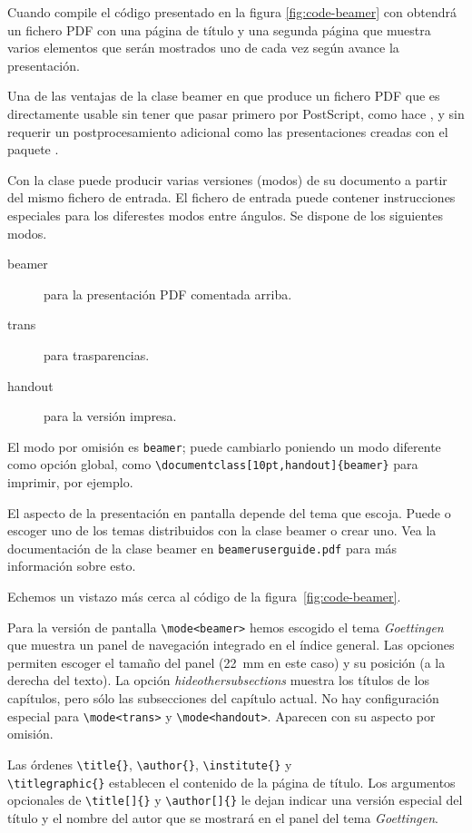 Cuando compile el código presentado en la figura \ref{fig:code-beamer}
con  obtendrá un fichero PDF con una página de título y
una segunda página que muestra varios elementos que serán mostrados
uno de cada vez según avance la presentación.

Una de las ventajas de la clase beamer en que produce un fichero PDF
que es directamente usable sin tener que pasar primero por
PostScript, como hace , y sin requerir un
postprocesamiento adicional como las presentaciones creadas con el
paquete .

Con la clase  puede producir varias versiones (modos) de
su documento a partir del mismo fichero de entrada.  El fichero de
entrada puede contener instrucciones especiales para los diferestes
modos entre ángulos.  Se dispone de los siguientes modos.

\begin{description}
\item[beamer] para la presentación PDF comentada arriba.
\item[trans] para trasparencias.
\item[handout] para la versión impresa.
\end{description}
El modo por omisión es \texttt{beamer}; puede cambiarlo poniendo un
modo diferente como opción global, como
\verb|\documentclass[10pt,handout]{beamer}| para imprimir, por
ejemplo.

El aspecto de la presentación en pantalla depende del tema que
escoja.  Puede o escoger uno de los temas distribuidos con la clase
beamer o crear uno.  Vea la documentación de la clase beamer en 
\texttt{beameruserguide.pdf} para más información sobre esto.

Echemos un vistazo más cerca al código de la figura~\ref{fig:code-beamer}.

Para la versión de pantalla \verb|\mode<beamer>| hemos escogido el
tema \emph{Goettingen} que muestra un panel de navegación integrado en
el índice general.  Las opciones permiten escoger el tamaño del panel
(22~mm en este caso) y su posición (a la derecha del texto).  La
opción \emph{hideothersubsections} muestra los títulos de los
capítulos, pero sólo las subsecciones del capítulo actual.  No hay
configuración especial para \verb|\mode<trans>| y
\verb|\mode<handout>|.  Aparecen con su aspecto por omisión.

Las órdenes \verb|\title{}|, \verb|\author{}|, \verb|\institute{}| y\\
\verb|\titlegraphic{}| establecen el contenido de la página de título.
Los argumentos opcionales de \verb|\title[]{}| y \verb|\author[]{}| le
dejan indicar una versión especial del título y el nombre del autor
que se mostrará en el panel del tema \emph{Goettingen}.

